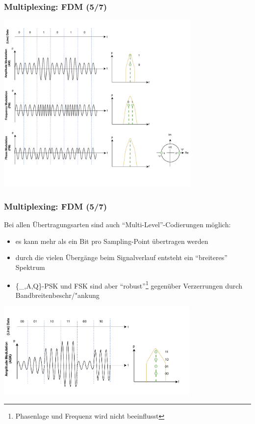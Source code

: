 \documentclass[ignorenonframetext]{beamer}
\begin{document}
\begin{frame}
\frametitle{Multiplexing: FDM (5/7)}
\includegraphics[height=9cm]{modulation-schemes}
\end{frame}





\begin{frame}
\frametitle{Multiplexing: FDM (5/7)}
Bei allen \"Ubertragungsarten sind auch ``Multi-Level''-Codierungen m\"oglich:


\begin{itemize}
  \item es kann mehr als ein Bit pro Sampling-Point \"ubertragen werden
  \item durch die vielen \"Uberg\"ange beim Signalverlauf entsteht ein ``breiteres'' Spektrum
  \item \{\_,A,Q\}-PSK und FSK sind aber ``robust''\footnote{Phasenlage und Frequenz wird nicht beeinflusst} gegen\"uber Verzerrungen durch Bandbreitenbeschr/"ankung
\end{itemize}

\includegraphics[width=10cm]{multilevel}
\end{frame}
\end{document}
